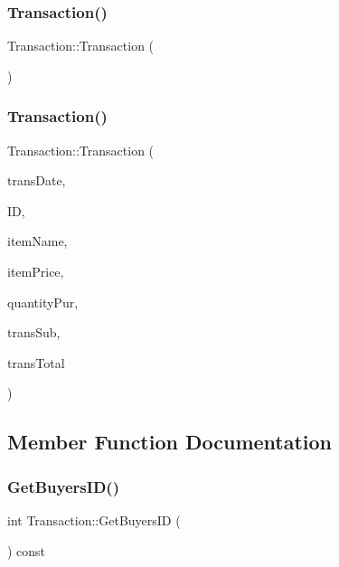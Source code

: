 \subsubsection{\texorpdfstring{Transaction()}{Transaction()}\hspace{0.1cm}{\footnotesize\ttfamily [1/2]}}
{\footnotesize\ttfamily Transaction\+::\+Transaction (\begin{DoxyParamCaption}{ }\end{DoxyParamCaption})}

\mbox{\label{class_transaction_ab581494699944e7d297344a6c2d26f56}} 
\subsubsection{\texorpdfstring{Transaction()}{Transaction()}\hspace{0.1cm}{\footnotesize\ttfamily [2/2]}}
{\footnotesize\ttfamily Transaction\+::\+Transaction (\begin{DoxyParamCaption}\item[{Q\+String}]{trans\+Date,  }\item[{int}]{ID,  }\item[{Q\+String}]{item\+Name,  }\item[{double}]{item\+Price,  }\item[{int}]{quantity\+Pur,  }\item[{double}]{trans\+Sub,  }\item[{double}]{trans\+Total }\end{DoxyParamCaption})}



\subsection{Member Function Documentation}
\mbox{\label{class_transaction_a58d5c852fc5ca0599df9298d23996bde}} 
\subsubsection{\texorpdfstring{Get\+Buyers\+I\+D()}{GetBuyersID()}}
{\footnotesize\ttfamily int Transaction\+::\+Get\+Buyers\+ID (\begin{DoxyParamCaption}{ }\end{DoxyParamCaption}) const}

